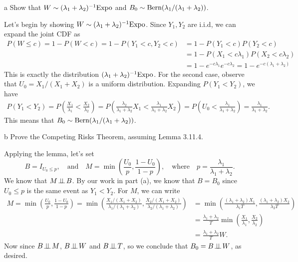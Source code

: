 \documentclass{pset}
\begin{document}
\begin{parts}
  \begin{part}{a}
    Show that $W\sim (\lambda_1 +\lambda_2)^{-1}\textrm{Expo}$ and $B_0 \sim \textrm{Bern}(\lambda_1 / (\lambda_1 + \lambda_2))$. %
  \end{part}

  Let's begin by showing $W \sim (\lambda_1 + \lambda_2)^{-1} \textrm{Expo}$. Since $Y_1, Y_2$ are i.i.d, we can expand the joint CDF as
  \[
    \begin{aligned}
      P(W \leq c) = 1 - P(W < c) = 1 - P(Y_1 < c, Y_2 < c) &= 1 - P(Y_1 < c)P(Y_2 < c)\\
                                                           &=1 - P(X_1 < c\lambda_1) P(X_2 < c\lambda_2)\\
                                                           &= 1 - e^{-c\lambda_1}e^{-c\lambda_2}
                                                           = 1 - e^{-c(\lambda_1 + \lambda_2)}
    \end{aligned}
  \]
  This is exactly the distribution $(\lambda_1+\lambda_2)^{-1}\textrm{Expo}$. For the second case, observe that $U_0 = X_1 / (X_1 + X_2)$ is a uniform distribution. Expanding $P(Y_1 < Y_2)$, we have
  \[
    \begin{aligned}
      P(Y_1 < Y_2) = P\left(\frac{X_1}{\lambda_1} < \frac{X_2}{\lambda_2}\right) = P\left(\frac{\lambda_2}{\lambda_1+\lambda_2} X_1 < \frac{\lambda_1}{\lambda_1+\lambda_2} X_2\right) = P\left(U_0 < \frac{\lambda_1}{\lambda_1 + \lambda_2}\right) = \frac{\lambda_1}{\lambda_1 + \lambda_2}.
    \end{aligned}
  \]
  This means that $B_0 \sim \textrm{Bern}(\lambda_1 / (\lambda_1 + \lambda_2))$.

  \begin{part}{b}
    Prove the Competing Risks Theorem, assuming Lemma 3.11.4.
  \end{part}

  Applying the lemma, let's set \[B = I_{U_0 \leq p},\quad\textrm{and}\quad M = \min\left(\frac{U_0}{p}, \frac{1-U_0}{1-p} \right), \quad \textrm{where}\quad p = \frac{\lambda_1}{\lambda_1 + \lambda_2}.\]
  We know that $M \!\perp\!\!\!\perp\! B$. By our work in part (a), we know that $B = B_0$ since $U_0 \leq p$ is the same event as $Y_1 < Y_2$. For $M$, we can write
  \[\begin{aligned}M = \min\left(\frac{U_0}{p}, \frac{1-U_0}{1-p}\right) = \min\left(\frac{X_1/(X_1 + X_2)}{\lambda_1 / (\lambda_1 + \lambda_2)}, \frac{X_2 / (X_1 + X_2)}{\lambda_2 / (\lambda_1 + \lambda_2)}\right)
    &=\min\left(\frac{(\lambda_1 + \lambda_2) X_1}{\lambda_1 T}, \frac{(\lambda_1 + \lambda_2)X_2}{\lambda_2 T}\right)\\
    &=\frac{\lambda_1+\lambda_2}{T}\min\left(\frac{X_1}{\lambda_1}, \frac{X_2}{\lambda_2}\right)\\&=\frac{\lambda_1 + \lambda_2}{T}W.
  \end{aligned}\]
  Now since $B \!\perp\!\!\!\perp\! M$, $B\!\perp\!\!\!\perp\! W$ and $B\!\perp\!\!\!\perp\! T$, so we conclude that $B_0 = B\!\perp\!\!\!\perp\! W$, as desired.


\end{parts}
\end{document}
